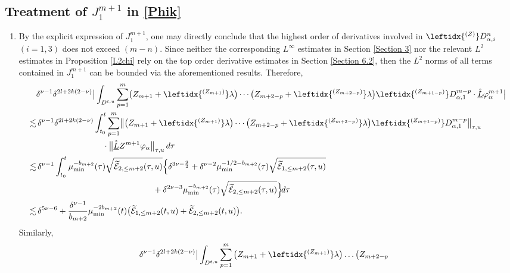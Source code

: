 \documentclass[11pt,twoside]{article}
\def\al{\alpha}
\begin{document}
\subsection{Treatment of $J_1^{m+1}$ in \eqref{Phik}}\label{tot}
\begin{enumerate}
\item
By the explicit expression of $J_1^{m+1}$, one may directly conclude that the highest order of derivatives involved in $\leftidx{^{(Z)}}D_{\al,i}^{n}$ $(i=1,3)$ does not exceed $(m-n)$. Since neither the corresponding $L^\infty$ estimates in Section \ref{Section 3} nor the relevant $L^2$ estimates in Proposition \ref{L2chi} rely on the top order derivative estimates in Section \ref{Section 6.2},
then the $L^2$ norms  of
all terms contained in $J_1^{m+1}$ can be bounded via the aforementioned results.
Therefore,
\begin{align}
&\delta^{\nu-1}\delta^{2l+2k(2-\nu)}
\big|
\int_{D^{t, u}}
\sum_{p=1}^{m}
\bigl(Z_{m+1}+\leftidx{^{(Z_{m+1})}}\lambda\bigr)
\cdots
\bigl(Z_{m+2-p}+\leftidx{^{(Z_{m+2-p})}}\lambda\bigr)
\leftidx{^{(Z_{m+1-p})}}D_{\al,1}^{m-p}
\cdot\mathring{\underline L}\varphi_\al^{m+1}
\big|
\notag\\
\lesssim&\,
\delta^{\nu-1}\delta^{2l+2k(2-\nu)}
\int_{t_0}^t
\sum_{p=1}^{m}
\bigl\|
\bigl(Z_{m+1}+\leftidx{^{(Z_{m+1})}}\lambda\bigr)
\cdots
\bigl(Z_{m+2-p}+\leftidx{^{(Z_{m+2-p})}}\lambda\bigr)
\leftidx{^{(Z_{m+1-p})}}D_{\al,1}^{m-p}
\bigr\|_{\tau,u}
\notag\\
&\qquad\qquad\qquad\qquad
\cdot\bigl\|\mathring{\underline L}Z^{m+1}\varphi_\al\bigr\|_{\tau,u}\,d\tau
\notag\\
\lesssim&\,
\delta^{\nu-1}
\int_{t_0}^t
\mu_{\min}^{-b_{m+2}}(\tau)
\sqrt{\widetilde{\mathcal{E}}_{2,\leq m+2}(\tau,u)}
\Big\{
\delta^{3\nu-\frac{9}{2}}
+ \delta^{\nu-2}\mu_{\min}^{-1/2-b_{m+2}}(\tau)\sqrt{\widetilde{\mathcal{E}}_{1,\leq m+2}(\tau,u)}
\notag\\
&\qquad\qquad\qquad\qquad\qquad\qquad\qquad
+ \delta^{2\nu-3}\mu_{\min}^{-b_{m+2}}(\tau)\sqrt{\widetilde{\mathcal{E}}_{2,\leq m+2}(\tau,u)}
\Big\}\!d\tau
\notag\\
\lesssim&\,
\delta^{5\nu-6}
+ \frac{\delta^{\nu-1}}{b_{m+2}}
\mu_{\min}^{-2b_{m+2}}(t)
\big({\widetilde{\mathcal{E}}_{1,\leq m+2}(t,u)}
+{\widetilde{\mathcal{E}}_{2,\leq m+2}(t,u)}
\big).\label{D11}
\end{align}
Similarly,
\begin{align}
&\delta^{\nu-1}\delta^{2l+2k(2-\nu)}\big|\int_{D^{t, u}}\sum_{p=1}^{m}\big(Z_{m+1}+\leftidx{^{(Z_{m+1})}}\lambda\big)\dots\big(Z_{m+2-p}

\end{align}
\end{enumerate}
\end{document}
